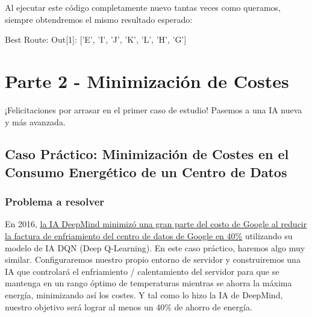 \documentclass[]{book}
\newenvironment{Shaded}{\begin{snugshade}}{\end{snugshade}}
\newcommand{\DecValTok}[1]{\textcolor[rgb]{0.00,0.00,0.81}{#1}}
\newcommand{\NormalTok}[1]{#1}
\newcommand{\StringTok}[1]{\textcolor[rgb]{0.31,0.60,0.02}{#1}}
\begin{document}
Al ejecutar este código completamente nuevo tantas veces como queramos, siempre obtendremos el mismo resultado esperado:

\begin{Shaded}
\begin{Highlighting}[]
\NormalTok{Best Route:}
\NormalTok{Out[}\DecValTok{1}\NormalTok{]: [}\StringTok{'E'}\NormalTok{, }\StringTok{'I'}\NormalTok{, }\StringTok{'J'}\NormalTok{, }\StringTok{'K'}\NormalTok{, }\StringTok{'L'}\NormalTok{, }\StringTok{'H'}\NormalTok{, }\StringTok{'G'}\NormalTok{]}
\end{Highlighting}
\end{Shaded}

\hypertarget{parte-2---minimizaciuxf3n-de-costes}{%
\chapter{Parte 2 - Minimización de Costes}\label{parte-2---minimizaciuxf3n-de-costes}}

¡Felicitaciones por arrasar en el primer caso de estudio! Pasemos a una IA nueva y más avanzada.

\hypertarget{caso-pruxe1ctico-minimizaciuxf3n-de-costes-en-el-consumo-energuxe9tico-de-un-centro-de-datos}{%
\section{Caso Práctico: Minimización de Costes en el Consumo Energético de un Centro de Datos}\label{caso-pruxe1ctico-minimizaciuxf3n-de-costes-en-el-consumo-energuxe9tico-de-un-centro-de-datos}}

\hypertarget{problema-a-resolver-1}{%
\subsection{Problema a resolver}\label{problema-a-resolver-1}}

En 2016, \href{https://deepmind.com/blog/deepmind-ai-reduces-google-data-centre-cooling-bill-40/}{la IA DeepMind minimizó una gran parte del costo de Google al reducir la factura de enfriamiento del centro de datos de Google en 40\%} utilizando su modelo de IA DQN (Deep Q-Learning). En este caso práctico, haremos algo muy similar. Configuraremos nuestro propio entorno de servidor y construiremos una IA que controlará el enfriamiento / calentamiento del servidor para que se mantenga en un rango óptimo de temperaturas mientras se ahorra la máxima energía, minimizando así los costes. Y tal como lo hizo la IA de DeepMind, nuestro objetivo será lograr al menos un 40\% de ahorro de energía.
\end{document}
